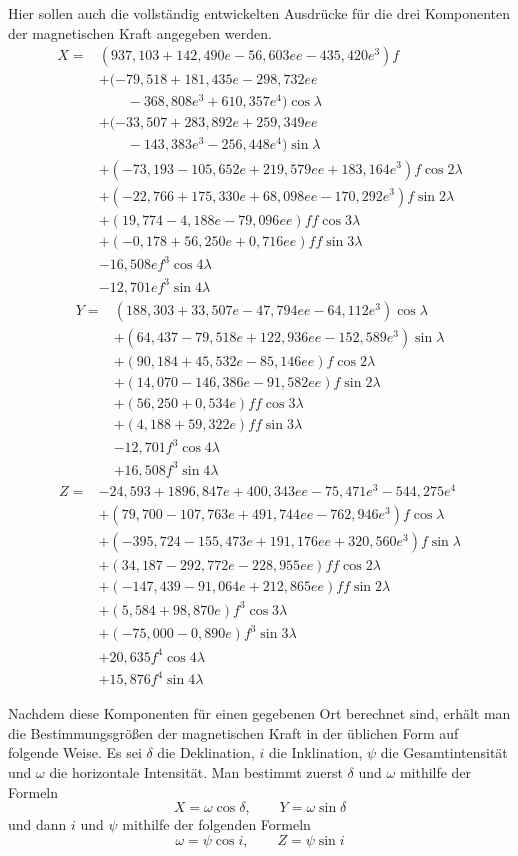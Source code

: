 Hier sollen auch die vollständig entwickelten Ausdrücke für die drei Komponenten der magnetischen Kraft angegeben werden.
\[
\begin{aligned}
X={}&(937{,}103+142{,}490e-56{,}603ee-435{,}420e^3)f\\
&+(-79{,}518+181{,}435e-298{,}732ee\\
&\qquad-368{,}808e^3+610{,}357e^4)\cos\lambda\\
&+(-33{,}507+283{,}892e+259{,}349ee\\
&\qquad-143{,}383e^3-256{,}448e^4)\sin\lambda\\
&+(-73{,}193-105{,}652e+219{,}579ee+183{,}164e^3)f\cos2\lambda\\
&+(-22{,}766+175{,}330e+68{,}098ee-170{,}292e^3)f\sin2\lambda\\
&+(19{,}774-4{,}188e-79{,}096ee)ff\cos3\lambda\\
&+(-0{,}178+56{,}250e+0{,}716ee)ff\sin3\lambda\\
&-16{,}508ef^3\cos4\lambda\\
&-12{,}701ef^3\sin4\lambda
\end{aligned}
\]
\[
\begin{aligned}
Y={}&(188{,}303+33{,}507e-47{,}794ee-64{,}112e^3)\cos\lambda\\
&+(64{,}437-79{,}518e+122{,}936ee-152{,}589e^3)\sin\lambda\\
&+(90{,}184+45{,}532e-85{,}146ee)f\cos2\lambda\\
&+(14{,}070-146{,}386e-91{,}582ee)f\sin2\lambda\\
&+(56{,}250+0{,}534e)ff\cos3\lambda\\
&+(4{,}188+59{,}322e)ff\sin3\lambda\\
&-12{,}701f^3\cos4\lambda\\
&+16{,}508f^3\sin4\lambda
\end{aligned}
\]
\[
\begin{aligned}
Z={}&-24{,}593+1896{,}847e+400{,}343ee-75{,}471e^3-544{,}275e^4\\
&+(79{,}700-107{,}763e+491{,}744ee-762{,}946e^3)f\cos\lambda\\
&+(-395{,}724-155{,}473e+191{,}176ee+320{,}560e^3)f\sin\lambda\\
&+(34{,}187-292{,}772e-228{,}955ee)ff\cos2\lambda\\
&+(-147{,}439-91{,}064e+212{,}865ee)ff\sin2\lambda\\
&+(5{,}584+98{,}870e)f^3\cos3\lambda\\
&+(-75{,}000-0{,}890e)f^3\sin3\lambda\\
&+20{,}635f^4\cos4\lambda\\
&+15{,}876f^4\sin4\lambda
\end{aligned}
\]

Nachdem diese Komponenten für einen gegebenen Ort berechnet sind, erhält man die Bestimmungsgrößen der magnetischen Kraft in der üblichen Form auf folgende Weise. Es sei $\delta$ die Deklination, $i$ die Inklination, $\psi$ die Gesamtintensität und $\omega$ die horizontale Intensität. Man bestimmt zuerst $\delta$ und $\omega$ mithilfe der Formeln
\[
X=\omega\cos\delta,\qquad Y=\omega\sin\delta
\]
und dann $i$ und $\psi$ mithilfe der folgenden Formeln
\[
\omega=\psi\cos i,\qquad Z=\psi\sin i
\]

